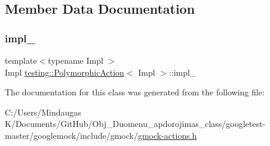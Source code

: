 \subsection{Member Data Documentation}
\mbox{\label{classtesting_1_1_polymorphic_action_ac072ea4c539fd1c6be75798fe9d801f4}} 
\subsubsection{\texorpdfstring{impl\_}{impl\_}}
{\footnotesize\ttfamily template$<$typename Impl $>$ \\
Impl \mbox{\hyperlink{classtesting_1_1_polymorphic_action}{testing\+::\+Polymorphic\+Action}}$<$ Impl $>$\+::impl\+\_\+\hspace{0.3cm}{\ttfamily [private]}}



The documentation for this class was generated from the following file\+:\begin{DoxyCompactItemize}
\item 
C\+:/\+Users/\+Mindaugas K/\+Documents/\+Git\+Hub/\+Obj\+\_\+\+Duomenu\+\_\+apdorojimas\+\_\+class/googletest-\/master/googlemock/include/gmock/\mbox{\hyperlink{googletest-master_2googlemock_2include_2gmock_2gmock-actions_8h}{gmock-\/actions.\+h}}\end{DoxyCompactItemize}

